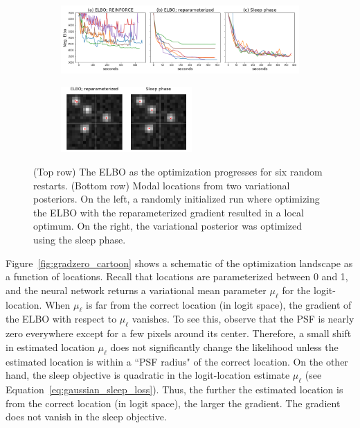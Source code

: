 \begin{figure}[!htb]
    \centering
    \begin{subfigure}[t]{0.9\textwidth}
    \centering
    \includegraphics[width=\textwidth]{figures/optim_path_compare.png}
    \end{subfigure}
    \begin{subfigure}[t]{\textwidth}
    \centering
    \includegraphics[width=0.55\textwidth]{figures/optim_path_detect_compare.png}
    \end{subfigure}
    \vspace{-3em}
    \caption{(Top row) The ELBO as the optimization progresses for six random restarts. 
    (Bottom row) Modal locations from two variational posteriors.
    On the left, a randomly initialized run where optimizing the ELBO with the reparameterized gradient resulted in a local optimum.
    On the right, the variational posterior 
    was optimized using the sleep phase. }
    \label{fig:optim_path}
\end{figure}

Figure~\ref{fig:gradzero_cartoon} shows a schematic of the optimization landscape as a function of locations.
Recall that locations are parameterized between 0 and 1, and the neural network returns a variational mean parameter $\mu_\ell$ for the logit-location. 
When $\mu_\ell$ is far from the correct location (in logit space), the gradient of the ELBO with respect to $\mu_\ell$ vanishes. 
To see this, observe that the PSF is nearly zero everywhere except for a few pixels around its center. Therefore, a small shift in estimated location $\mu_\ell$ does not significantly change the likelihood unless the estimated location is within a ``PSF radius" of the correct location.
On the other hand, the sleep objective is quadratic in the logit-location estimate $\mu_\ell$ (see Equation~\ref{eq:gaussian_sleep_loss}).
Thus, the further the estimated location is from the correct location (in logit space), the larger the gradient. The gradient does not vanish in the sleep objective. 

